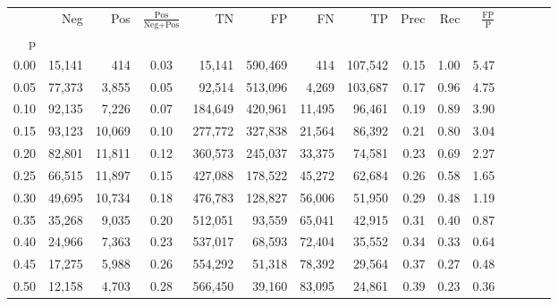 \begin{tabular}{rrrcrrrrrrrrrrr}
\toprule
{} &     Neg &     Pos & $\frac{\text{Pos}}{\text{Neg}+\text{Pos}}$ &       TN &       FP &       FN &       TP &  Prec &   Rec & $\frac{\text{FP}}{\text{P}}$ \\
p    &         &         &                                            &          &          &          &          &       &       &                              \\
\midrule
0.00 &  15,141 &     414 &                                       0.03 &   15,141 &  590,469 &      414 &  107,542 &  0.15 &  1.00 &                         5.47 \\
0.05 &  77,373 &   3,855 &                                       0.05 &   92,514 &  513,096 &    4,269 &  103,687 &  0.17 &  0.96 &                         4.75 \\
0.10 &  92,135 &   7,226 &                                       0.07 &  184,649 &  420,961 &   11,495 &   96,461 &  0.19 &  0.89 &                         3.90 \\
0.15 &  93,123 &  10,069 &                                       0.10 &  277,772 &  327,838 &   21,564 &   86,392 &  0.21 &  0.80 &                         3.04 \\
0.20 &  82,801 &  11,811 &                                       0.12 &  360,573 &  245,037 &   33,375 &   74,581 &  0.23 &  0.69 &                         2.27 \\
0.25 &  66,515 &  11,897 &                                       0.15 &  427,088 &  178,522 &   45,272 &   62,684 &  0.26 &  0.58 &                         1.65 \\
0.30 &  49,695 &  10,734 &                                       0.18 &  476,783 &  128,827 &   56,006 &   51,950 &  0.29 &  0.48 &                         1.19 \\
0.35 &  35,268 &   9,035 &                                       0.20 &  512,051 &   93,559 &   65,041 &   42,915 &  0.31 &  0.40 &                         0.87 \\
0.40 &  24,966 &   7,363 &                                       0.23 &  537,017 &   68,593 &   72,404 &   35,552 &  0.34 &  0.33 &                         0.64 \\
0.45 &  17,275 &   5,988 &                                       0.26 &  554,292 &   51,318 &   78,392 &   29,564 &  0.37 &  0.27 &                         0.48 \\
0.50 &  12,158 &   4,703 &                                       0.28 &  566,450 &   39,160 &   83,095 &   24,861 &  0.39 &  0.23 &                         0.36 \\

\end{tabular}

